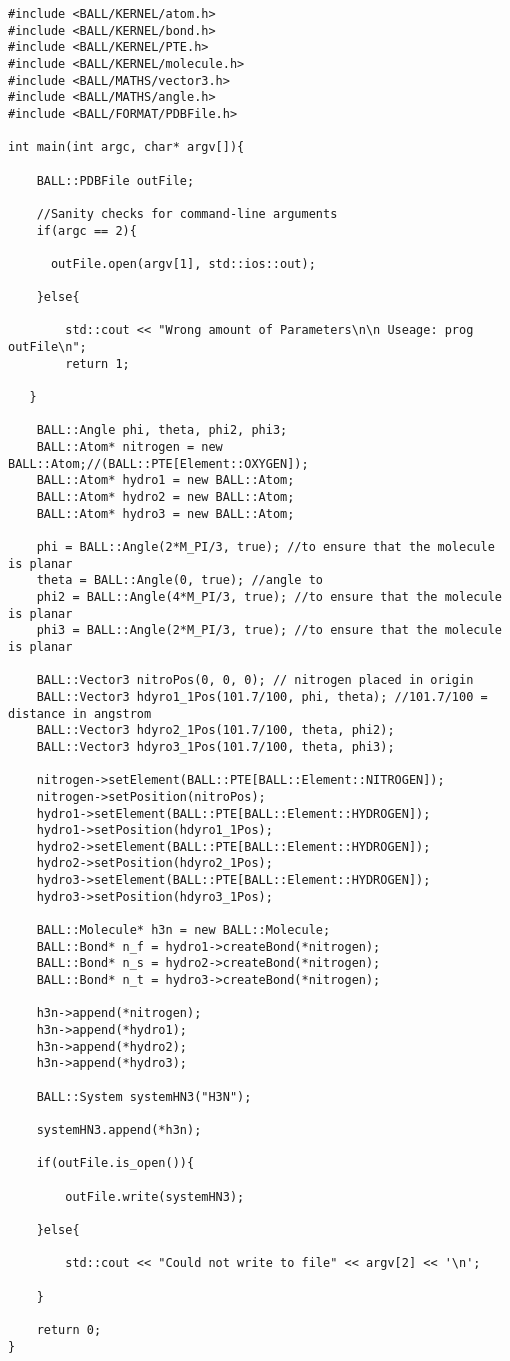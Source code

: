 \documentclass[11pt]{article}
\begin{document}
\begin{lstlisting}
#include <BALL/KERNEL/atom.h>
#include <BALL/KERNEL/bond.h>
#include <BALL/KERNEL/PTE.h>
#include <BALL/KERNEL/molecule.h>
#include <BALL/MATHS/vector3.h>
#include <BALL/MATHS/angle.h>
#include <BALL/FORMAT/PDBFile.h>

int main(int argc, char* argv[]){

	BALL::PDBFile outFile;

	//Sanity checks for command-line arguments	
	if(argc == 2){

      outFile.open(argv[1], std::ios::out);

	}else{

    	std::cout << "Wrong amount of Parameters\n\n Useage: prog outFile\n";
    	return 1;

   }

    BALL::Angle phi, theta, phi2, phi3;
    BALL::Atom* nitrogen = new BALL::Atom;//(BALL::PTE[Element::OXYGEN]);
    BALL::Atom* hydro1 = new BALL::Atom;
    BALL::Atom* hydro2 = new BALL::Atom;
    BALL::Atom* hydro3 = new BALL::Atom;

	phi = BALL::Angle(2*M_PI/3, true); //to ensure that the molecule is planar
	theta = BALL::Angle(0, true); //angle to
	phi2 = BALL::Angle(4*M_PI/3, true); //to ensure that the molecule is planar
	phi3 = BALL::Angle(2*M_PI/3, true); //to ensure that the molecule is planar

	BALL::Vector3 nitroPos(0, 0, 0); // nitrogen placed in origin
	BALL::Vector3 hdyro1_1Pos(101.7/100, phi, theta); //101.7/100 = distance in angstrom
	BALL::Vector3 hdyro2_1Pos(101.7/100, theta, phi2);
	BALL::Vector3 hdyro3_1Pos(101.7/100, theta, phi3);

	nitrogen->setElement(BALL::PTE[BALL::Element::NITROGEN]);
	nitrogen->setPosition(nitroPos);
	hydro1->setElement(BALL::PTE[BALL::Element::HYDROGEN]);
	hydro1->setPosition(hdyro1_1Pos);
	hydro2->setElement(BALL::PTE[BALL::Element::HYDROGEN]);
	hydro2->setPosition(hdyro2_1Pos);
	hydro3->setElement(BALL::PTE[BALL::Element::HYDROGEN]);
	hydro3->setPosition(hdyro3_1Pos);

	BALL::Molecule* h3n = new BALL::Molecule;
	BALL::Bond* n_f = hydro1->createBond(*nitrogen);
	BALL::Bond* n_s = hydro2->createBond(*nitrogen);
	BALL::Bond* n_t = hydro3->createBond(*nitrogen);
	
	h3n->append(*nitrogen);
	h3n->append(*hydro1);
	h3n->append(*hydro2);
	h3n->append(*hydro3);

	BALL::System systemHN3("H3N");

	systemHN3.append(*h3n);

	if(outFile.is_open()){

		outFile.write(systemHN3);

	}else{

		std::cout << "Could not write to file" << argv[2] << '\n';

	}	

	return 0;
}
\end{lstlisting}
\end{document}
